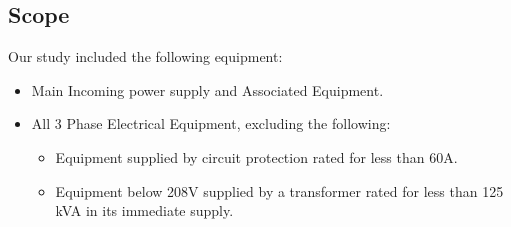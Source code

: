 \subsection{Scope}
\label{af:intro:scope}

Our study included the following equipment:
\begin{itemize}
	\item Main Incoming power supply and Associated Equipment.
	\item All 3 Phase Electrical Equipment, excluding the following:
	\begin{itemize}
		\item Equipment supplied by circuit protection rated for less than 60A. 
		\item Equipment below 208V supplied by a transformer rated for less than 125 kVA in its immediate supply.
	\end{itemize}
\end{itemize}



